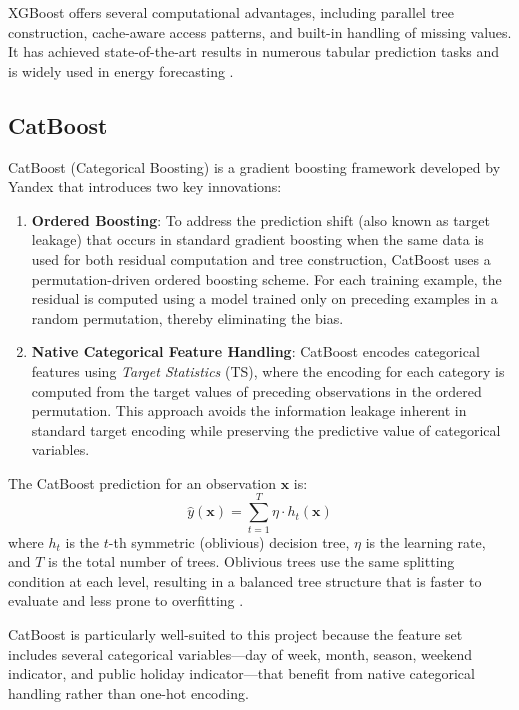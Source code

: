 XGBoost offers several computational advantages, including parallel tree construction, cache-aware access patterns, and built-in handling of missing values. It has achieved state-of-the-art results in numerous tabular prediction tasks and is widely used in energy forecasting \parencite{khan2020hybrid}.


\subsection{CatBoost}\label{sec:catboost}

CatBoost (Categorical Boosting) \parencite{prokhorenkova2018catboost} is a gradient boosting framework developed by Yandex that introduces two key innovations:

\begin{enumerate}
    \item \textbf{Ordered Boosting}: To address the prediction shift (also known as target leakage) that occurs in standard gradient boosting when the same data is used for both residual computation and tree construction, CatBoost uses a permutation-driven ordered boosting scheme. For each training example, the residual is computed using a model trained only on preceding examples in a random permutation, thereby eliminating the bias.
    
    \item \textbf{Native Categorical Feature Handling}: CatBoost encodes categorical features using \emph{Target Statistics} (TS), where the encoding for each category is computed from the target values of preceding observations in the ordered permutation. This approach avoids the information leakage inherent in standard target encoding while preserving the predictive value of categorical variables.
\end{enumerate}

The CatBoost prediction for an observation $\mathbf{x}$ is:
\begin{equation}\label{eq:catboost_pred}
    \hat{y}(\mathbf{x}) = \sum_{t=1}^{T} \eta \cdot h_t(\mathbf{x})
\end{equation}
where $h_t$ is the $t$-th symmetric (oblivious) decision tree, $\eta$ is the learning rate, and $T$ is the total number of trees. Oblivious trees use the same splitting condition at each level, resulting in a balanced tree structure that is faster to evaluate and less prone to overfitting \parencite{dorogush2018catboostfeatures}.

CatBoost is particularly well-suited to this project because the feature set includes several categorical variables---day of week, month, season, weekend indicator, and public holiday indicator---that benefit from native categorical handling rather than one-hot encoding.

